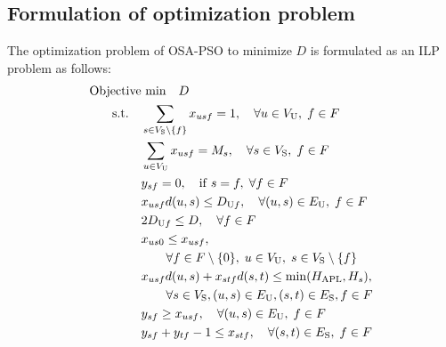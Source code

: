 \documentclass[conference]{IEEEtran}
\begin{document}
\begin{CJK}{UTF8}{ipxm}
\subsection{Formulation of optimization problem}
The optimization problem of OSA-PSO to minimize $D$ is formulated as an ILP problem as follows:
\begin{subequations} \label{OSA-PSO}
  \begin{align}
  \text{Objective}&\text{ min}\quad D \label{OSA-PSO_a} \\
  \rm{s.t.} \quad
  &\sum_{s \in V_{\rm{S}} \setminus \{f\}} x_{usf} = 1, \quad \forall u \in V_{\rm{U}}, \; f \in F \label{OSA-PSO_b} \\
  &\sum_{u \in V_{\rm{U}}} x_{usf} = M_s, \quad \forall s \in V_{\rm{S}}, \; f \in F \label{OSA-PSO_b'} \\  %
  &y_{sf} = 0, \quad \mathrm{if} \; s = f, \; \forall f \in F \label{OSA-PSO_c} \\  %
  &x_{usf}d(u,s) \le D_{\mathrm{U}f}, \quad \forall (u,s) \in E_{\rm{U}}, \; f \in F \label{OSA-PSO_d} \\
  &2D_{\mathrm{U}f} \le D, \quad \forall f \in F \label{OSA-PSO_e} \\
  &x_{us0} \le x_{usf}, \notag \\
  &\qquad \forall f \in F \setminus \{0\}, \; u \in V_{\rm{U}}, \; s \in V_{\rm{S}} \setminus \{f\} \label{OSA-PSO_f} \\
  &x_{usf}d(u,s) + x_{stf}d(s,t) \le \min(H_{\rm APL},H_s), \notag \\
  &\qquad \forall s \in V_{\rm{S}}, (u,s) \in E_{\rm{U}}, (s,t) \in E_{\rm{S}}, f \in F \label{OSA-PSO_g} \\
  &y_{sf} \geq x_{usf}, \quad \forall (u,s) \in E_{\rm{U}}, \; f \in F \label{OSA-PSO_h} \\
  &y_{sf} + y_{tf} - 1 \le x_{stf}, \quad \forall (s,t) \in E_{\rm{S}}, \; f \in F \label{OSA-PSO_i} \\

\end{align}
\end{subequations}
\end{CJK}
\end{document}
